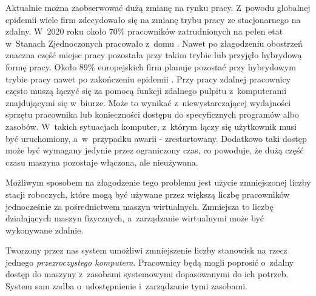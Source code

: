 \documentclass[../wstep.tex]{subfiles}
\begin{document}
Aktualnie można zaobserwować dużą zmianę na rynku pracy.
Z~powodu globalnej epidemii wiele firm zdecydowało się na zmianę trybu pracy ze stacjonarnego na zdalny. W~2020 roku około $70\%$ pracowników zatrudnionych na pełen etat w~Stanach Zjednoczonych pracowało z~domu \parencite{remote-2020}.
Nawet po złagodzeniu obostrzeń znaczna część miejsc pracy pozostała przy takim trybie lub przyjęło hybrydową formę pracy. Około $89\%$ europejskich firm planuje pozostać przy hybrydowym trybie pracy nawet po zakończeniu epidemii \parencite{remote-2021}.
Przy pracy zdalnej pracownicy często muszą łączyć się za pomocą funkcji zdalnego pulpitu z~komputerami znajdującymi się w~biurze.
Może to wynikać z~niewystarczającej wydajności sprzętu pracownika lub konieczności dostępu do specyficznych programów albo zasobów.
W~takich sytuacjach komputer, z~którym łączy się użytkownik musi być uruchomiony, a~w~przypadku awarii - zrestartowany.
Dodatkowo taki dostęp może być wymagany jedynie przez ograniczony czas, co powoduje, że dużą część czasu maszyna pozostaje włączona, ale nieużywana.

Możliwym sposobem na złagodzenie tego problemu jest użycie zmniejszonej liczby stacji roboczych, które mogą być używane przez większą liczbę pracowników jednocześnie za pośrednictwem maszyn wirtualnych.
Zmniejsza to liczbę działających maszyn fizycznych, a~zarządzanie wirtualnymi może być wykonywane zdalnie.

Tworzony przez nas system umożliwi zmniejszenie liczby stanowisk na rzecz jednego \textit{przezroczystego komputera}.
Pracownicy będą mogli poprosić o~zdalny dostęp do maszyny z~zasobami systemowymi dopasowanymi do ich potrzeb.
System sam zadba o~udostępnienie i~zarządzanie tymi zasobami.
\end{document}
